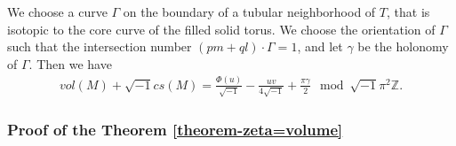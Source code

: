 \documentclass[12pt]{amsart}
\begin{document}
We choose a curve $\Gamma$ on the boundary of a tubular neighborhood of $T$, that
is isotopic to the core curve of the filled solid torus. We choose the orientation of $\Gamma$ such that the intersection number $(pm+ql)\cdot \Gamma=1$, and let $\gamma$ be the holonomy of $\Gamma$. Then we have
\begin{align}  \label{equation-vol=NZpotential}
    vol(M)+\sqrt{-1}cs(M)=\frac{\Phi(u)}{\sqrt{-1}}-\frac{uv}{4\sqrt{-1}}+\frac{\pi \gamma}{2}  \mod \sqrt{-1}\pi^2\mathbb{Z}.
\end{align}




\subsubsection{Proof of the Theorem \ref{theorem-zeta=volume}}
\end{document}
